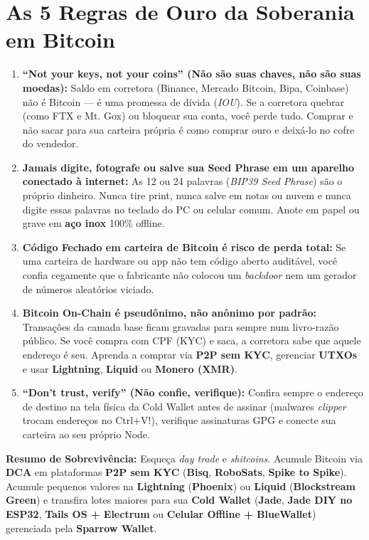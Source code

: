 \documentclass{pousadaguide}
\begin{document}
\section{As 5 Regras de Ouro da Soberania em Bitcoin}

\begin{enumerate}
  \item \textbf{“Not your keys, not your coins” (Não são suas chaves, não são suas moedas):} Saldo em corretora (Binance, Mercado Bitcoin, Bipa, Coinbase) não é Bitcoin — é uma promessa de dívida (\emph{IOU}). Se a corretora quebrar (como FTX e Mt. Gox) ou bloquear sua conta, você perde tudo. Comprar e não sacar para sua carteira própria é como comprar ouro e deixá-lo no cofre do vendedor.
  \item \textbf{Jamais digite, fotografe ou salve sua Seed Phrase em um aparelho conectado à internet:} As 12 ou 24 palavras (\emph{BIP39 Seed Phrase}) são o próprio dinheiro. Nunca tire print, nunca salve em notas ou nuvem e nunca digite essas palavras no teclado do PC ou celular comum. Anote em papel ou grave em \textbf{aço inox} 100\% offline.
  \item \textbf{Código Fechado em carteira de Bitcoin é risco de perda total:} Se uma carteira de hardware ou app não tem código aberto auditável, você confia cegamente que o fabricante não colocou um \emph{backdoor} nem um gerador de números aleatórios viciado.
  \item \textbf{Bitcoin On-Chain é pseudônimo, não anônimo por padrão:} Transações da camada base ficam gravadas para sempre num livro-razão público. Se você compra com CPF (KYC) e saca, a corretora sabe que aquele endereço é seu. Aprenda a comprar via \textbf{P2P sem KYC}, gerenciar \textbf{UTXOs} e usar \textbf{Lightning}, \textbf{Liquid} ou \textbf{Monero (XMR)}.
  \item \textbf{“Don't trust, verify” (Não confie, verifique):} Confira sempre o endereço de destino na tela física da Cold Wallet antes de assinar (malwares \emph{clipper} trocam endereços no Ctrl+V!), verifique assinaturas GPG e conecte sua carteira ao seu próprio Node.
\end{enumerate}

\begin{tldr}
\textbf{Resumo de Sobrevivência:} Esqueça \emph{day trade} e \emph{shitcoins}. Acumule Bitcoin via \textbf{DCA} em plataformas \textbf{P2P sem KYC} (\textbf{Bisq}, \textbf{RoboSats}, \textbf{Spike to Spike}). Acumule pequenos valores na \textbf{Lightning} (\textbf{Phoenix}) ou \textbf{Liquid} (\textbf{Blockstream Green}) e transfira lotes maiores para sua \textbf{Cold Wallet} (\textbf{Jade}, \textbf{Jade DIY no ESP32}, \textbf{Tails OS + Electrum} ou \textbf{Celular Offline + BlueWallet}) gerenciada pela \textbf{Sparrow Wallet}.
\end{tldr}
\end{document}
